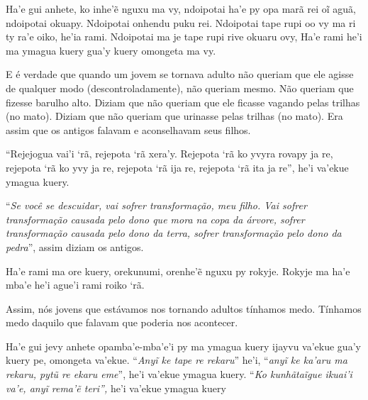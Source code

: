 \bigskip

\begin{paracol}{2}
\footnotesize
\bigskip
\medskip

\noindent
Ha'e gui anhete, ko inhe'ẽ nguxu ma vy, ndoipotai ha'e py opa marã rei
oĩ aguã, ndoipotai okuapy. Ndoipotai onhendu puku rei. Ndoipotai tape
rupi oo vy ma ri ty ra'e oiko, he'ia rami. Ndoipotai ma je tape rupi
rive okuaru ovy, Ha'e rami he'i ma ymagua kuery gua'y kuery omongeta ma
vy.

\bigskip
\medskip

\switchcolumn
\noindent
E é verdade que quando um jovem se tornava adulto não queriam que ele
agisse de qualquer modo (descontroladamente), não queriam mesmo. Não
queriam que fizesse barulho alto. Diziam que não queriam que ele
ficasse vagando pelas trilhas (no mato). Diziam que não queriam que
urinasse pelas trilhas (no mato). Era assim que os antigos falavam e
aconselhavam seus filhos. 

\smallskip

\switchcolumn
\noindent
``Rejejogua vai’i ‘rã, rejepota ‘rã xera’y. Rejepota ‘rã ko yvyra rovapy
ja re, rejepota ‘rã ko yvy ja re, rejepota ‘rã ija re, rejepota ‘rã ita
ja re'', he’i va’ekue ymagua kuery. 

\bigskip

\switchcolumn
\noindent
``\emph{Se você se descuidar, vai sofrer transformação, meu filho. Vai
sofrer transformação causada pelo dono que mora na copa da árvore,
sofrer transformação causada pelo dono da terra, sofrer transformação
pelo dono da pedra}'', assim diziam os antigos.

\smallskip

\switchcolumn
\noindent
Ha'e rami ma ore kuery, orekunumi, orenhe'ẽ nguxu py rokyje. Rokyje ma
ha'e mba'e he'i ague'i rami roiko `rã.

\bigskip

\switchcolumn
\noindent
Assim, nós jovens que estávamos nos tornando adultos tínhamos medo.
Tínhamos medo daquilo que falavam que poderia nos acontecer. 

\smallskip

\switchcolumn
\noindent
Ha'e gui jevy anhete opamba'e-mba'e'i py ma ymagua kuery ijayvu va'ekue
gua'y kuery pe, omongeta va'ekue. ``\emph{Anyĩ ke tape re rekaru}''
he'i, ``\emph{anyĩ ke ka'aru ma rekaru, pytũ re ekaru eme}'', he'i
va'ekue ymagua kuery. ``\emph{Ko kunhãtaĩgue ikuai'i va'e, anyĩ rema'ẽ
teri'',} he'i va'ekue ymagua kuery


\end{paracol}
